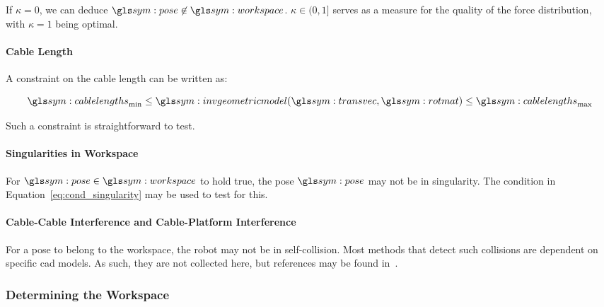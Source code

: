 				If	$\kappa  =	0$,  we  can  deduce  $\pose  \not\in
				\workspace$.  $\kappa \in (0, 1]$ serves as a measure for the
				quality of the force distribution, with $\kappa = 1$ being
				optimal.

			\paragraph{Cable Length}%
			\label{sec:cable_length}

				A constraint on the cable length can be written as:

				\begin{equation}
					\cablelengths_{\min}
						\leq \invgeometricmodel(\transvec, \rotmatbare)
						\leq \cablelengths_{\max}
				\end{equation}


				Such a constraint is straightforward to test.


			\paragraph{Singularities in Workspace}%
			\label{sec:singularities_in_workspace}

				For $\pose\in\workspace$ to hold true, the pose $\pose$ may not
				be in singularity. The condition in
				Equation~\ref{eq:cond_singularity} may be used to test for this.

			\paragraph{Cable-Cable Interference and Cable-Platform Interference}%
			\label{sec:cable_cable_interference_and_cable_platform_interference}

				For a pose to belong to the workspace, the robot may not be in
				self-collision. Most methods that detect such collisions are
				dependent on specific \gls{cad} models. As such, they are not
				collected here, but references may be found in~\cite[][page
				171]{bib:cdpr:cable_driven_parallel_robots_theory_and_application}.

		\subsubsection{Determining the Workspace}%
		\label{sec:determining_the_workspace}

